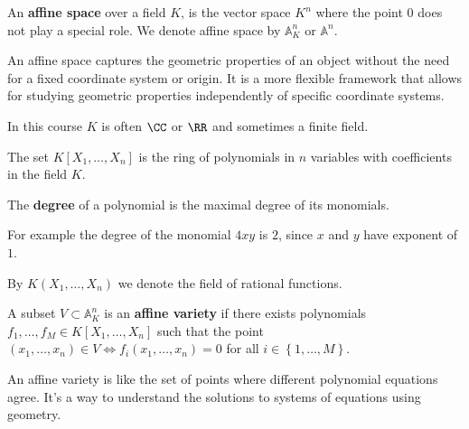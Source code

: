 \documentclass[12pt, a4paper]{article}
\renewcommand{\AA}{\mathbb A}
\begin{document}
\begin{definition}
    An \textbf{affine space} over a field \(K\), is the vector space \(K^n\) where the point \(0\) does not play a special role. We denote affine space by \(\AA^n_K\) or \(\AA^n\).
\end{definition}

\begin{mdnote}
    An affine space captures the geometric properties of an object without the need for a fixed coordinate system or origin. It is a more flexible framework that allows for studying geometric properties independently of specific coordinate systems.
\end{mdnote}

\begin{mdremark}
    In this course \(K\) is often \(\CC\) or \(\RR\) and sometimes a finite field.
\end{mdremark}

\begin{definition}
    The set \(K[X_1,\ldots,X_n]\) is the ring of polynomials in \(n\) variables with coefficients in the field \(K\). 
\end{definition}

\begin{definition}
    The \textbf{degree} of a polynomial is the maximal degree of its monomials.
\end{definition}

\begin{mdremark}
    For example the degree of the monomial \(4xy\) is \(2\), since \(x\) and \(y\) have exponent of \(1\). 
\end{mdremark}

\begin{definition}
    By \(K(X_1,\ldots,X_n)\) we denote the field of rational functions. 
\end{definition}

\begin{definition}
    A subset \(V \subset \AA_K^n\) is an \textbf{affine variety} if there exists polynomials \(f_1,\ldots,f_M \in K[X_1,\ldots,X_n]\) such that the point \((x_1,\ldots,x_n) \in V \iff f_i(x_1,\ldots,x_n)=0\) for all \(i \in \left\{ 1,\ldots,M \right\}\).
\end{definition}

\begin{mdnote}
    An affine variety is like the set of points where different polynomial equations agree. It's a way to understand the solutions to systems of equations using geometry.
\end{mdnote}
\end{document}
